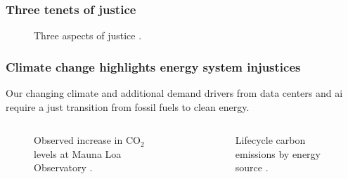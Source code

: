 \begin{frame}
    \frametitle{Three tenets of justice}
    \begin{figure}
        \centering

        \caption{Three aspects of justice \cite{schlosberg_1_2007}.}
    \end{figure}
\end{frame}

\begin{frame}
    \frametitle{Climate change highlights energy system injustices}
    Our changing climate and additional demand drivers from data 
    centers and \gls{ai} require a just transition from fossil 
    fuels to clean energy.
    \begin{columns}
        \column[t]{5cm}
        \begin{figure}
            \centering
            \resizebox{\columnwidth}{!}{}
            \caption{Observed increase in CO$_2$ levels at Mauna Loa Observatory
            \cite{kane_atmospheric_1996}.}
            \label{figure:mauna-loa}
        \end{figure}
        
        \column[t]{5cm}
        \begin{figure}
            \centering
            \resizebox{\columnwidth}{!}{}
            \caption{Lifecycle carbon emissions by energy source
            \cite{united_nations_economic_commission_for_europe_carbon_2022}.}
            \label{figure:energy-emissions}
        \end{figure}
    \end{columns}

\end{frame}

